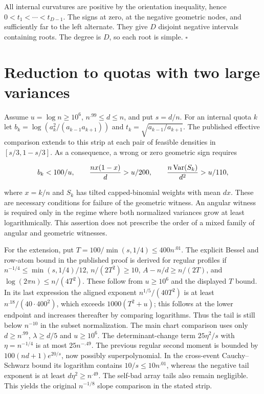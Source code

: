 \documentclass[11pt]{article}
\begin{document}
All internal curvatures are positive by the orientation inequality, hence $0<t_1<\cdots<t_{D-1}$. The signs at zero, at the negative geometric nodes, and sufficiently far to the left alternate. They give $D$ disjoint negative intervals containing roots. The degree is $D$, so each root is simple. $\square$

\section{Reduction to quotas with two large variances}

Assume $u=\log n\ge10^6$, $n^{.99}\le d\le n$, and put $s=d/n$. For an internal quota $k$ let $b_k=\log(a_k^2/(a_{k-1}a_{k+1}))$ and $t_k=\sqrt{a_{k-1}/a_{k+1}}$. The published effective comparison extends to this strip at each pair of feasible densities in $[s/3,1-s/3]$. As a consequence, a wrong or zero geometric sign requires

\[
b_k<100/u,\qquad
\frac{n x(1-x)}d>u/200,\qquad
\frac{n\thinspace{}\mathrm{Var}(S_k)}{d^2}> u/110,
\]

where $x=k/n$ and $S_k$ has tilted capped-binomial weights with mean $dx$. These are necessary conditions for failure of the geometric witness. An angular witness is required only in the regime where both normalized variances grow at least logarithmically. This assertion does not prescribe the order of a mixed family of angular and geometric witnesses.

For the extension, put $T=100/\min(s,1/4)\le400 n^{.01}$. The explicit Bessel and row-atom bound in the published proof is derived for regular profiles if $n^{-1/4}\le\min(s,1/4)/12$, $n/(2T^2)\ge10$, $A-n/d\ge n/(2T)$, and $\log(2\pi n)\le n/(4T^2)$. These follow from $u\ge10^6$ and the displayed $T$ bound. In its last expression the aligned exponent $n^{1/5}/(40T^2)$ is at least $n^{.18}/(40\cdot400^2)$, which exceeds $1000(T^2+u)$; this follows at the lower endpoint and increases thereafter by comparing logarithms. Thus the tail is still below $n^{-10}$ in the subset normalization. The main chart comparison uses only $d\ge n^{.99}$, $\lambda\ge d/5$ and $u\ge10^6$. The determinant-change term $25\eta^2/s$ with $\eta=n^{-1/4}$ is at most $25n^{-.49}$. The previous regular second moment is bounded by $100(nd+1)e^{20/s}$, now possibly superpolynomial. In the cross-event Cauchy--Schwarz bound its logarithm contains $10/s\le10n^{.01}$, whereas the negative tail exponent is at least $d\eta^2\ge n^{.49}$. The self-bad array tails also remain negligible. This yields the original $n^{-1/8}$ slope comparison in the stated strip.
\end{document}
